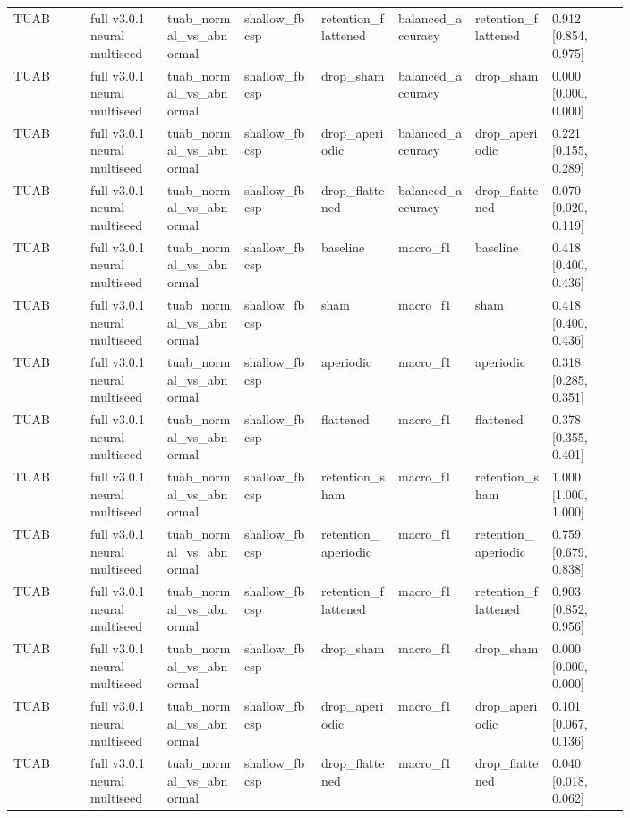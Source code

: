 \begin{longtable}{p{0.10\linewidth}p{0.10\linewidth}p{0.10\linewidth}p{0.10\linewidth}p{0.10\linewidth}p{0.10\linewidth}p{0.10\linewidth}p{0.10\linewidth}}
TUAB & full v3.0.1 neural multiseed & tuab\_normal\_vs\_abnormal & shallow\_fbcsp & retention\_flattened & balanced\_accuracy & retention\_flattened & 0.912 [0.854, 0.975]\\
TUAB & full v3.0.1 neural multiseed & tuab\_normal\_vs\_abnormal & shallow\_fbcsp & drop\_sham & balanced\_accuracy & drop\_sham & 0.000 [0.000, 0.000]\\
TUAB & full v3.0.1 neural multiseed & tuab\_normal\_vs\_abnormal & shallow\_fbcsp & drop\_aperiodic & balanced\_accuracy & drop\_aperiodic & 0.221 [0.155, 0.289]\\
TUAB & full v3.0.1 neural multiseed & tuab\_normal\_vs\_abnormal & shallow\_fbcsp & drop\_flattened & balanced\_accuracy & drop\_flattened & 0.070 [0.020, 0.119]\\
TUAB & full v3.0.1 neural multiseed & tuab\_normal\_vs\_abnormal & shallow\_fbcsp & baseline & macro\_f1 & baseline & 0.418 [0.400, 0.436]\\
TUAB & full v3.0.1 neural multiseed & tuab\_normal\_vs\_abnormal & shallow\_fbcsp & sham & macro\_f1 & sham & 0.418 [0.400, 0.436]\\
TUAB & full v3.0.1 neural multiseed & tuab\_normal\_vs\_abnormal & shallow\_fbcsp & aperiodic & macro\_f1 & aperiodic & 0.318 [0.285, 0.351]\\
TUAB & full v3.0.1 neural multiseed & tuab\_normal\_vs\_abnormal & shallow\_fbcsp & flattened & macro\_f1 & flattened & 0.378 [0.355, 0.401]\\
TUAB & full v3.0.1 neural multiseed & tuab\_normal\_vs\_abnormal & shallow\_fbcsp & retention\_sham & macro\_f1 & retention\_sham & 1.000 [1.000, 1.000]\\
TUAB & full v3.0.1 neural multiseed & tuab\_normal\_vs\_abnormal & shallow\_fbcsp & retention\_aperiodic & macro\_f1 & retention\_aperiodic & 0.759 [0.679, 0.838]\\
TUAB & full v3.0.1 neural multiseed & tuab\_normal\_vs\_abnormal & shallow\_fbcsp & retention\_flattened & macro\_f1 & retention\_flattened & 0.903 [0.852, 0.956]\\
TUAB & full v3.0.1 neural multiseed & tuab\_normal\_vs\_abnormal & shallow\_fbcsp & drop\_sham & macro\_f1 & drop\_sham & 0.000 [0.000, 0.000]\\
TUAB & full v3.0.1 neural multiseed & tuab\_normal\_vs\_abnormal & shallow\_fbcsp & drop\_aperiodic & macro\_f1 & drop\_aperiodic & 0.101 [0.067, 0.136]\\
TUAB & full v3.0.1 neural multiseed & tuab\_normal\_vs\_abnormal & shallow\_fbcsp & drop\_flattened & macro\_f1 & drop\_flattened & 0.040 [0.018, 0.062]\\

\end{longtable}
